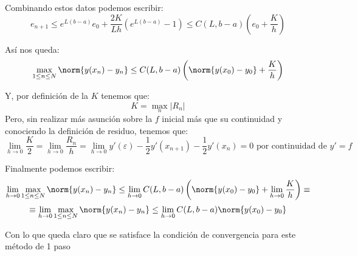 \begin{problem}[2]
Combinando estos datos podemos escribir:
\[e_{n+1} \leq e^{L(b-a)}e_0+\frac{2K}{Lh}\left( e^{L(b-a)}-1\right) \leq C(L,b-a)\left( e_0 +\frac{K}{h}\right)\]

Así nos queda:
\[\max_{1\leq n \leq N} \norm{y(x_n)-y_n} \leq C(L,b-a)\left( \norm{y(x_0)-y_0} +\frac{K}{h}\right)\]

Y, por definición de la $K$ tenemos que:
\[K = \max_n |R_n|\]
Pero, sin realizar más asunción sobre la $f$ inicial más que su continuidad y conociendo la definición de residuo, tenemos que:
\[\lim_{h\to 0} \frac{K}{2} = \lim_{h \to 0} \frac{R_n}{h} = \lim_{h \to 0} y'(ε)-\frac{1}{2}y'(x_{n+1})-\frac{1}{2}y'(x_n) = 0 \text{ por continuidad de } y'=f\]

Finalmente podemos escribir:
\[\lim_{h\to 0}\max_{1\leq n \leq N} \norm{y(x_n)-y_n} \leq \lim_{h \to 0}C(L,b-a)\left( \norm{y(x_0)-y_0} +\lim_{h \to 0}\frac{K}{h}\right) \equiv\]
\[\equiv \lim_{h\to 0}\max_{1\leq n \leq N} \norm{y(x_n)-y_n} \leq \lim_{h \to 0}C(L,b-a) \norm{y(x_0)-y_0} \]

Con lo que queda claro que se satisface la condición de convergencia para este método de 1 paso
\end{problem}

